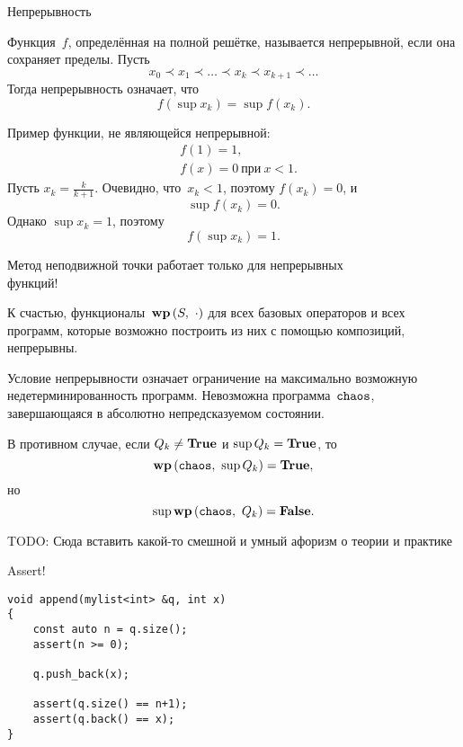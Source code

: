 \documentclass[landscape]{slides}
\begin{document}
\begin{slide}
        Непрерывность

        Функция~$f$, определённая на полной решётке, называется непрерывной, если она сохраняет пределы.
        Пусть
        \[
                x_0\prec x_1\prec\ldots\prec x_k\prec x_{k+1}\prec\ldots
        \]
        Тогда непрерывность означает, что
        \[
                f\left(\sup{x_k}\right) = \sup f\left(x_k\right) .
        \]

        Пример функции, не являющейся непрерывной:
        \begin{eqnarray*}
                &f(1) = 1 ,\\
                &f(x) = 0\ \text{при}\ x<1.
        \end{eqnarray*}
        Пусть $x_k = \frac{k}{k+1}$. Очевидно, что~$x_k < 1$, поэтому $f(x_k) = 0$, и
        \[
                \sup f(x_k) = 0 .
        \]
        Однако $\sup x_k = 1$, поэтому
        \[
                f(\sup x_k) = 1 .
        \]
\end{slide}

\begin{slide}
        Метод неподвижной точки работает только для непрерывных\\функций!

        К счастью, функционалы~$\mathbf{wp}\left({S},\ {\cdot}\right)$ для всех базовых операторов и всех программ,
        которые возможно построить из них с помощью композиций, непрерывны.

        Условие непрерывности означает ограничение на максимально возможную недетерминированность
        программ. Невозможна программа~$\mathtt{chaos}$, завершающаяся в абсолютно непредсказуемом состоянии.

        В противном случае, если $Q_k\ne\mathbf{True}$ и $\sup Q_k = \mathbf{True}$, то
        \[
                \mathbf{wp}\left({\mathtt{chaos}},\ {\sup Q_k}\right) = \mathbf{True},
        \]
        но
        \[
                \sup \mathbf{wp}\left({\mathtt{chaos}},\ {Q_k}\right) = \mathbf{False}.
        \]
\end{slide}

\begin{slide}
    \begin{center}
        \begin{LARGE}
            TODO: Сюда вставить какой-то смешной и умный афоризм о теории и практике
        \end{LARGE}
    \end{center}
\end{slide}

\begin{slide}
Assert!

\begin{verbatim}
void append(mylist<int> &q, int x)
{
    const auto n = q.size();
    assert(n >= 0);

    q.push_back(x);

    assert(q.size() == n+1);
    assert(q.back() == x);
}
\end{verbatim}
\end{slide}
\end{document}
